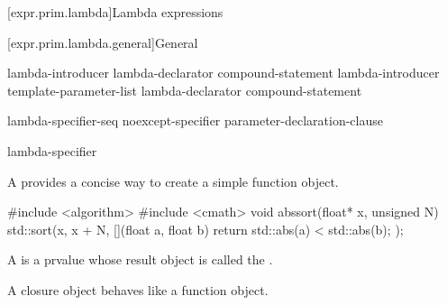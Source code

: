 [expr.prim.lambda]{Lambda expressions}%

[expr.prim.lambda.general]{General}%

\begin{bnf}
\br
    lambda-introducer  lambda-declarator compound-statement\br
    lambda-introducer \terminal{<} template-parameter-list \terminal{>}  \br
    \bnfindent lambda-declarator compound-statement
\end{bnf}

\begin{bnf}
\br
    \terminal{[}  \terminal{]}
\end{bnf}

\begin{bnf}
\br
    lambda-specifier-seq   \br
    noexcept-specifier  \br
    \br
    \terminal{(} parameter-declaration-clause \terminal{)}   \br
    \bnfindent {} 
\end{bnf}

\begin{bnf}
\br
    \br
    \br
    \br
\end{bnf}

\begin{bnf}
\br
    lambda-specifier 
\end{bnf}

\pnum
A  provides
a concise way to create a simple function object.
\begin{example}
\begin{codeblock}
#include <algorithm>
#include <cmath>
void abssort(float* x, unsigned N) {
  std::sort(x, x + N, [](float a, float b) { return std::abs(a) < std::abs(b); });
}
\end{codeblock}
\end{example}

\pnum
A  is a prvalue
whose result object is called the .
\begin{note}
A closure object behaves like a function
object.
\end{note}

